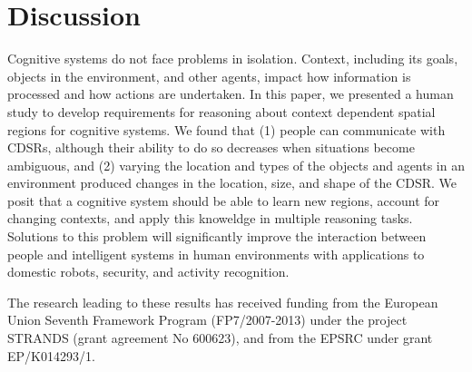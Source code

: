 \documentclass[11pt,letterpaper]{article}
\begin{document}



\section{Discussion}
Cognitive systems do not face problems in isolation.  Context, including its goals, objects in the environment, and other agents, impact how information is processed and how actions are undertaken.  In this paper, we presented a human study to develop requirements for reasoning about context dependent spatial regions for cognitive systems.  We found that (1) people can communicate with CDSRs, although their ability to do so decreases when situations become ambiguous, and (2) varying the location and types of the objects and agents in an environment produced changes in the location, size, and shape of the CDSR.  We posit that a cognitive system should be able to learn new regions, account for changing contexts, and apply this knoweldge in multiple reasoning tasks. Solutions to this problem will significantly improve the interaction between people and intelligent systems in human environments with applications to domestic robots, security, and activity recognition.

\begin{acknowledgements} 
\noindent
The research leading to these results has received funding from the European Union Seventh Framework Program (FP7/2007-2013) under the project STRANDS (grant agreement No 600623), and from the EPSRC under grant EP/K014293/1.
\end{acknowledgements} 




\vspace{-0.25in}

{\parindent -10pt\leftskip 10pt\noindent
\footnotesize



}

\end{document}
